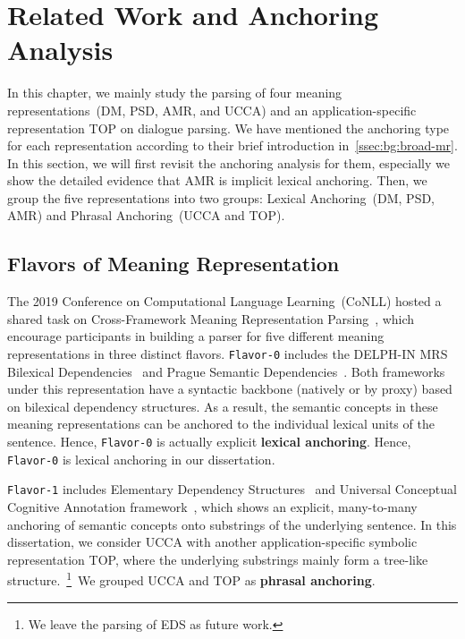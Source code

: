 \section[Related Work and Anchoring Analysis]{Related Work and
  Anchoring Analysis}
\label{sec:lex-phr:factorization-analysis}

In this chapter, we mainly study the parsing of four meaning
representations~(DM, PSD, AMR, and UCCA) and an application-specific
representation TOP on dialogue parsing. We have mentioned the
anchoring type for each representation according to their brief
introduction in~\autoref{ssec:bg:broad-mr}. In this section, we will
first revisit the anchoring analysis for them, especially we show the
detailed evidence that AMR is implicit lexical anchoring. Then, we
group the five representations into two groups: Lexical Anchoring~(DM,
PSD, AMR) and Phrasal Anchoring~(UCCA and TOP).

\subsection{Flavors of Meaning Representation}
\label{ssec:lex-phr:flavors}

The 2019 Conference on Computational Language Learning~(CoNLL) hosted
a shared task on Cross-Framework Meaning Representation
Parsing~\cite[MRP 2019,][]{Oep:Abe:Haj:19}, which encourage
participants in building a parser for five different meaning
representations in three distinct flavors. \texttt{Flavor-0} includes
the DELPH-IN MRS Bilexical Dependencies~\cite[DM,][]{Iva:Oep:Ovr:12}
and Prague Semantic
Dependencies~\cite[PSD,][]{hajic2012announcing,miyao2014house}. Both
frameworks under this representation have a syntactic backbone
(natively or by proxy) based on bilexical dependency
structures. As a result, the semantic concepts in these meaning
representations can be anchored to the individual lexical units of the
sentence. Hence, \texttt{Flavor-0} is actually explicit
\textbf{lexical anchoring}. Hence, \texttt{Flavor-0} is
lexical anchoring in our dissertation.

\texttt{Flavor-1} includes Elementary Dependency
Structures~\cite[EDS,][]{Oep:Lon:06} and Universal
Conceptual Cognitive Annotation
framework~\cite[UCCA,][]{Abe:Rap:13b}, which shows an explicit,
many-to-many anchoring of semantic concepts onto substrings of the
underlying sentence. In this dissertation, we consider UCCA with another
application-specific symbolic representation TOP, where the underlying
substrings mainly form a tree-like structure.~\footnote{We leave the
  parsing of EDS as future work.}~We grouped UCCA and TOP as
\textbf{phrasal anchoring}.

